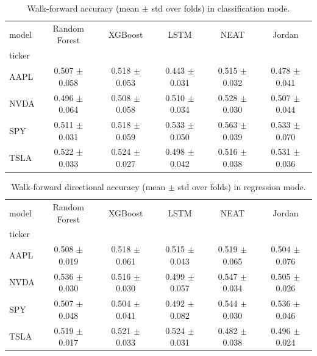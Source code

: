 \begin{table}
\caption{Walk-forward accuracy (mean $\pm$ std over folds) in classification mode.}
\label{tab:wf_classification}
\begin{tabular}{lccccc}
\toprule
model & Random Forest & XGBoost & LSTM & NEAT & Jordan \\
ticker &  &  &  &  &  \\
\midrule
AAPL & 0.507 $\pm$ 0.058 & 0.518 $\pm$ 0.053 & 0.443 $\pm$ 0.031 & 0.515 $\pm$ 0.032 & 0.478 $\pm$ 0.041 \\
NVDA & 0.496 $\pm$ 0.064 & 0.508 $\pm$ 0.058 & 0.510 $\pm$ 0.034 & 0.528 $\pm$ 0.030 & 0.507 $\pm$ 0.044 \\
SPY & 0.511 $\pm$ 0.031 & 0.518 $\pm$ 0.059 & 0.533 $\pm$ 0.050 & 0.563 $\pm$ 0.039 & 0.533 $\pm$ 0.070 \\
TSLA & 0.522 $\pm$ 0.033 & 0.524 $\pm$ 0.027 & 0.498 $\pm$ 0.042 & 0.516 $\pm$ 0.038 & 0.531 $\pm$ 0.036 \\
\bottomrule
\end{tabular}
\end{table}


\begin{table}
\caption{Walk-forward directional accuracy (mean $\pm$ std over folds) in regression mode.}
\label{tab:wf_regression}
\begin{tabular}{lccccc}
\toprule
model & Random Forest & XGBoost & LSTM & NEAT & Jordan \\
ticker &  &  &  &  &  \\
\midrule
AAPL & 0.508 $\pm$ 0.019 & 0.518 $\pm$ 0.061 & 0.515 $\pm$ 0.043 & 0.519 $\pm$ 0.065 & 0.504 $\pm$ 0.076 \\
NVDA & 0.536 $\pm$ 0.030 & 0.516 $\pm$ 0.030 & 0.499 $\pm$ 0.057 & 0.547 $\pm$ 0.034 & 0.505 $\pm$ 0.026 \\
SPY & 0.507 $\pm$ 0.048 & 0.504 $\pm$ 0.041 & 0.492 $\pm$ 0.082 & 0.544 $\pm$ 0.030 & 0.536 $\pm$ 0.046 \\
TSLA & 0.519 $\pm$ 0.017 & 0.521 $\pm$ 0.033 & 0.524 $\pm$ 0.031 & 0.482 $\pm$ 0.038 & 0.496 $\pm$ 0.024 \\
\bottomrule
\end{tabular}
\end{table}
